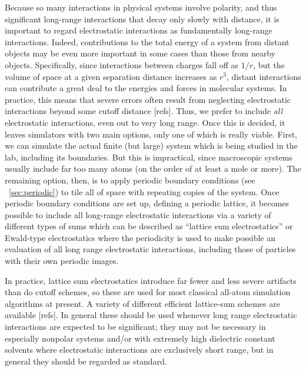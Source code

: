 \documentclass[9pt,bestpractices]{livecoms}
\begin{document}
Because so many interactions in physical systems involve polarity, and thus
significant long-range interactions that decay only slowly with distance, it is
important to regard electrostatic interactions as fundamentally long-range
interactions.  Indeed, contributions to the total energy of a system from
distant objects may be even more important in some cases than those from nearby
objects.  Specifically, since interactions between charges fall off as $1/r$,
but the volume of space at a given separation distance increases as $r^3$,
distant interactions can contribute a great deal to the energies and forces in
molecular systems.  In practice, this means that severe errors often result from
neglecting electrostatic interactions beyond some cutoff distance [refs].  Thus,
we prefer to include \emph{all} electrostatic interactions, even out to very
long range.  Once this is decided, it  leaves simulators with two main options,
only one of which is really viable.  First, we can simulate the actual finite
(but large) system which is being studied in the lab, including its boundaries.
But this is impractical, since macroscopic systems usually include far too many
atoms (on the order of at least a mole or more).  The remaining option, then, is
to apply periodic boundary conditions (see ~\ref{sec:periodic}) to tile all of
space with repeating copies of the system.  Once periodic boundary conditions
are set up, defining a periodic lattice, it becomes possible to include all
long-range electrostatic interactions via a variety of different types of sums
which can be described as ``lattice sum electrostatics'' or Ewald-type
electrostatics where the periodicity is used to make possible an evaluation of
all long range electrostatic interactions, including those of particles with
their own periodic images.

In practice, lattice sum electrostatics introduce far fewer and less severe
artifacts than do cutoff schemes, so these are used for most classical all-atom
simulation algorithms at present.  A variety of different efficient lattice-sum
schemes are available [refs].  In general these should be used whenever long
range electrostatic interactions are expected to be significant; they may not be
necessary in especially nonpolar systems and/or with extremely high dielectric
constant solvents where electrostatic interactions are exclusively short range,
but in general they should be regarded as standard. 
\end{document}
